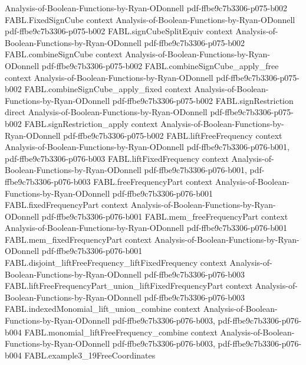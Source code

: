 \begin{theorem}
  {Analysis-of-Boolean-Functions-by-Ryan-ODonnell}
  {pdf-ffbe9c7b3306-p075-b002}
\proofstep
  {FABL.FixedSignCube}
  {context}
  {Analysis-of-Boolean-Functions-by-Ryan-ODonnell}
  {pdf-ffbe9c7b3306-p075-b002}
\proofstep
  {FABL.signCubeSplitEquiv}
  {context}
  {Analysis-of-Boolean-Functions-by-Ryan-ODonnell}
  {pdf-ffbe9c7b3306-p075-b002}
\proofstep
  {FABL.combineSignCube}
  {context}
  {Analysis-of-Boolean-Functions-by-Ryan-ODonnell}
  {pdf-ffbe9c7b3306-p075-b002}
\proofstep
  {FABL.combineSignCube_apply_free}
  {context}
  {Analysis-of-Boolean-Functions-by-Ryan-ODonnell}
  {pdf-ffbe9c7b3306-p075-b002}
\proofstep
  {FABL.combineSignCube_apply_fixed}
  {context}
  {Analysis-of-Boolean-Functions-by-Ryan-ODonnell}
  {pdf-ffbe9c7b3306-p075-b002}
\proofstep
  {FABL.signRestriction}
  {direct}
  {Analysis-of-Boolean-Functions-by-Ryan-ODonnell}
  {pdf-ffbe9c7b3306-p075-b002}
\proofstep
  {FABL.signRestriction_apply}
  {context}
  {Analysis-of-Boolean-Functions-by-Ryan-ODonnell}
  {pdf-ffbe9c7b3306-p075-b002}
\proofstep
  {FABL.liftFreeFrequency}
  {context}
  {Analysis-of-Boolean-Functions-by-Ryan-ODonnell}
  {pdf-ffbe9c7b3306-p076-b001,
    pdf-ffbe9c7b3306-p076-b003}
\proofstep
  {FABL.liftFixedFrequency}
  {context}
  {Analysis-of-Boolean-Functions-by-Ryan-ODonnell}
  {pdf-ffbe9c7b3306-p076-b001,
    pdf-ffbe9c7b3306-p076-b003}
\proofstep
  {FABL.freeFrequencyPart}
  {context}
  {Analysis-of-Boolean-Functions-by-Ryan-ODonnell}
  {pdf-ffbe9c7b3306-p076-b001}
\proofstep
  {FABL.fixedFrequencyPart}
  {context}
  {Analysis-of-Boolean-Functions-by-Ryan-ODonnell}
  {pdf-ffbe9c7b3306-p076-b001}
\proofstep
  {FABL.mem_freeFrequencyPart}
  {context}
  {Analysis-of-Boolean-Functions-by-Ryan-ODonnell}
  {pdf-ffbe9c7b3306-p076-b001}
\proofstep
  {FABL.mem_fixedFrequencyPart}
  {context}
  {Analysis-of-Boolean-Functions-by-Ryan-ODonnell}
  {pdf-ffbe9c7b3306-p076-b001}
\proofstep
  {FABL.disjoint_liftFreeFrequency_liftFixedFrequency}
  {context}
  {Analysis-of-Boolean-Functions-by-Ryan-ODonnell}
  {pdf-ffbe9c7b3306-p076-b003}
\proofstep
  {FABL.liftFreeFrequencyPart_union_liftFixedFrequencyPart}
  {context}
  {Analysis-of-Boolean-Functions-by-Ryan-ODonnell}
  {pdf-ffbe9c7b3306-p076-b003}
\proofstep
  {FABL.indexedMonomial_lift_union_combine}
  {context}
  {Analysis-of-Boolean-Functions-by-Ryan-ODonnell}
  {pdf-ffbe9c7b3306-p076-b003,
    pdf-ffbe9c7b3306-p076-b004}
\proofstep
  {FABL.monomial_liftFreeFrequency_combine}
  {context}
  {Analysis-of-Boolean-Functions-by-Ryan-ODonnell}
  {pdf-ffbe9c7b3306-p076-b003,
    pdf-ffbe9c7b3306-p076-b004}
\proofstep
  {FABL.example3_19FreeCoordinates}

\end{theorem}
